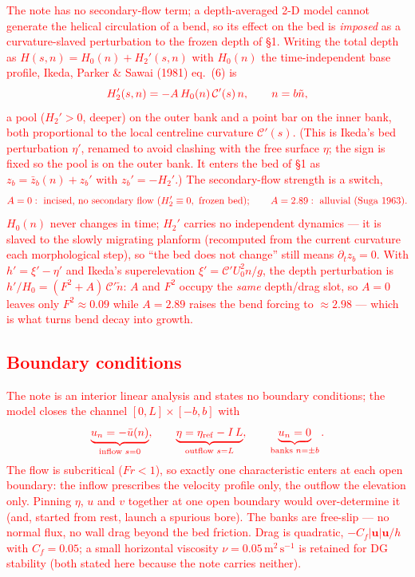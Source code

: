 \documentclass[11pt]{article}
\newcommand{\R}[1]{\textcolor{red}{#1}}
\newcommand{\bu}{\boldsymbol{u}}
\begin{document}
\R{The note has no secondary-flow term; a depth-averaged 2-D model cannot
generate the helical circulation of a bend, so its effect on the bed is
\emph{imposed} as a curvature-slaved perturbation to the frozen depth of §1.
Writing the total depth as $H(s,n)=H_0(n)+H_2'(s,n)$ with $H_0(n)$ the
time-independent base profile, Ikeda, Parker \& Sawai (1981) eq.~(6) is}
\begin{equation}
\R{H_2'(s,n) = -A\,H_0(n)\,\mathcal{C}'(s)\,n ,\qquad n=b\tilde n ,}
\end{equation}
\R{a pool ($H_2'>0$, deeper) on the outer bank and a point bar on the inner
bank, both proportional to the local centreline curvature $\mathcal{C}'(s)$.
(This is Ikeda's bed perturbation $\eta'$, renamed to avoid clashing with the
free surface $\eta$; the sign is fixed so the pool is on the outer bank. It
enters the bed of §1 as $z_b=\bar z_b(n)+z_b'$ with $z_b'=-H_2'$.)  The
secondary-flow strength is a switch,}
\begin{equation}
\R{A=0:\ \text{incised, no secondary flow}\ (H_2'\equiv0,\ \text{frozen bed});
   \qquad A=2.89:\ \text{alluvial (Suga 1963).}}
\end{equation}
\R{$H_0(n)$ never changes in time; $H_2'$ carries no independent dynamics --- it
is slaved to the slowly migrating planform (recomputed from the current
curvature each morphological step), so ``the bed does not change'' still means
$\partial_t z_b=0$.  With $h'=\xi'-\eta'$ and Ikeda's superelevation
$\xi'=\mathcal{C}'U_0^2 n/g$, the depth perturbation is
$h'/H_0=(F^2+A)\,\mathcal{C}'\tilde n$: $A$ and $F^2$ occupy the \emph{same}
depth/drag slot, so $A=0$ leaves only $F^2\!\approx\!0.09$ while $A=2.89$ raises
the bend forcing to $\approx2.98$ --- which is what turns bend decay into
growth.}

\R{\section{Boundary conditions}}

\R{The note is an interior linear analysis and states no boundary conditions;
the model closes the channel $[0,L]\times[-b,b]$ with}
\begin{equation}
\R{\underbrace{u_n=-\bar u(n)}_{\text{inflow }s=0},\qquad
   \underbrace{\eta=\eta_{\mathrm{ref}}-I\,L}_{\text{outflow }s=L},\qquad
   \underbrace{u_n=0}_{\text{banks }n=\pm b} .}
\end{equation}
\R{The flow is subcritical ($Fr<1$), so exactly one characteristic enters at
each open boundary: the inflow prescribes the velocity profile only, the
outflow the elevation only. Pinning $\eta$, $u$ and $v$ together at one open
boundary would over-determine it (and, started from rest, launch a spurious
bore). The banks are free-slip --- no normal flux, no wall drag beyond the bed
friction. Drag is quadratic, $-C_f|\bu|\bu/h$ with $C_f=0.05$; a small
horizontal viscosity $\nu=0.05\,\mathrm{m^2\,s^{-1}}$ is retained for
DG stability (both stated here because the note carries neither).}
\end{document}
